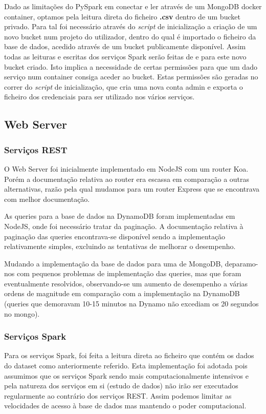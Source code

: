 \documentclass[11pt,a4paper]{article}
\begin{document}
Dado as limitações do PySpark em conectar e ler através de um MongoDB docker container, optamos pela leitura direta do ficheiro \textbf{.csv} dentro de um bucket privado. Para tal foi necessário através do \textit{script} de inicialização a criação de um novo bucket num projeto do utilizador, dentro do qual é importado o ficheiro da base de dados, acedido através de um bucket publicamente disponível. Assim todas as leituras e escritas dos serviços Spark serão feitas de e para este novo bucket criado. Isto implica a necessidade de certas permissões para que um dado serviço num container consiga aceder ao bucket. Estas permissões são geradas no correr do \textit{script} de inicialização, que cria uma nova conta admin e exporta o ficheiro dos credenciais para ser utilizado nos vários serviços.

\subsection{Web Server}
\subsubsection{Serviços REST}
O Web Server foi inicialmente implementado em NodeJS com um router Koa. Porém a documentação relativa ao router era escassa em comparação a outras alternativas, razão pela qual mudamos para um router Express que se encontrava com melhor documentação.

As queries para a base de dados na DynamoDB foram implementadas em NodeJS, onde foi necessário tratar da paginação. A documentação relativa à paginação das queries encontrava-se disponível sendo a implementação relativamente simples, excluindo as tentativas de melhorar o desempenho.

Mudando a implementação da base de dados para uma de MongoDB, deparamo-nos com pequenos problemas de implementação das queries, mas que foram eventualmente resolvidos, observando-se um aumento de desempenho a várias ordens de magnitude em comparação com a implementação na DynamoDB (queries que demoravam 10-15 minutos na Dynamo não excediam os 20 segundos no mongo).

\subsubsection{Serviços Spark}
Para os serviços Spark, foi feita a leitura direta ao ficheiro que contém os dados do dataset como anteriormente referido. Esta implementação foi adotada pois assumimos que os serviços Spark sendo mais computacionalmente intensivos e pela natureza dos serviços em si (estudo de dados) não irão ser executados regularmente ao contrário dos serviços REST. Assim podemos limitar as velocidades de acesso à base de dados mas mantendo o poder computacional.
\end{document}
